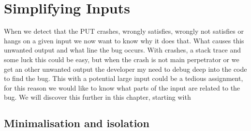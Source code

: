 \chapter{Simplifying Inputs}
\label{cha:3}
When we detect that the PUT crashes, wrongly satisfies, wrongly not satisfies or hangs on a given input we now want to know why it does that. What causes this unwanted output and what line the bug occurs. With crashes, a stack trace and some luck this could be easy, but when the crash is not main perpetrator or we get an other unwanted output the developer my need to debug deep into the code to find the bug. This with a potential large input could be a tedious assignment, for this reason we would like to know what parts of the input are related to the bug. We will discover this further in this chapter, starting with 

\section{Minimalisation and isolation}




%
%
%
%

